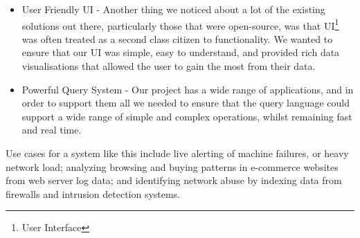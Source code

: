 \begin{itemize}
\item User Friendly UI - Another thing we noticed about a lot of the existing
  solutions out there, particularly those that were open-source, was that
  UI\footnote{User Interface} was
  often treated as a second class citizen to functionality. We wanted to ensure
  that our UI was simple, easy to understand, and provided rich data
  visualisations that allowed the user to gain the most from their data.

\item Powerful Query System - Our project has a wide range of applications, and
  in order to support them all we needed to ensure that the query language could
  support a wide range of simple and complex operations, whilst remaining fast
  and real time.

\end{itemize}

\vspace{5mm}

Use cases for a system like this include live alerting of machine failures, or
heavy network load; analyzing browsing and buying patterns in e-commerce
websites from web server log data; and identifying network abuse by indexing
data from firewalls and intrusion detection systems.
